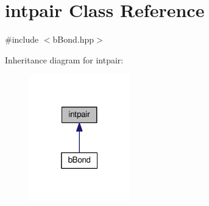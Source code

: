 \hypertarget{classintpair}{}\section{intpair Class Reference}
\label{classintpair}


{\ttfamily \#include $<$b\+Bond.\+hpp$>$}



Inheritance diagram for intpair\+:\nopagebreak
\begin{figure}[H]
\begin{center}
\leavevmode
\includegraphics[width=124pt]{classintpair__inherit__graph}
\end{center}
\end{figure}
